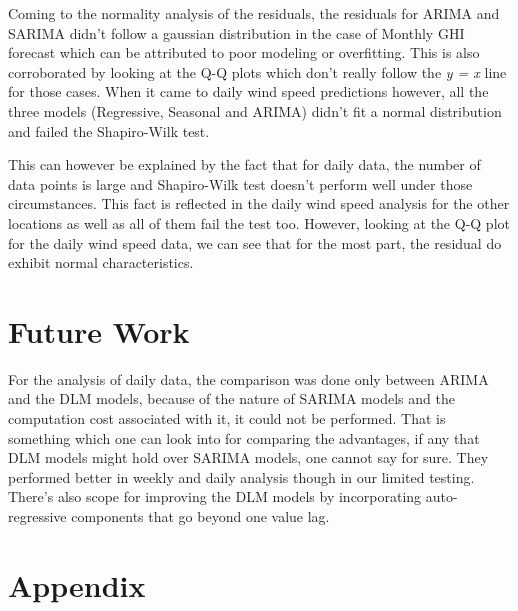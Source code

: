 \documentclass[a4paper,12pt]{article}
\begin{document}
Coming to the normality analysis of the residuals, the residuals for ARIMA and SARIMA didn't follow a gaussian distribution in the case of Monthly GHI forecast which can be attributed to poor modeling or overfitting. This is also corroborated by looking at the Q-Q plots which don't really follow the \emph{y = x} line for those cases. When it came to daily wind speed predictions however, all the three models (Regressive, Seasonal and ARIMA) didn't fit a normal distribution and failed the Shapiro-Wilk test.

This can however be explained by the fact that for daily data, the number of data points is large and Shapiro-Wilk test doesn't perform well under those circumstances. This fact is reflected in the daily wind speed analysis for the other locations as well as all of them fail the test too. However, looking at the Q-Q plot for the daily wind speed data, we can see that for the most part, the residual do exhibit normal characteristics.
\section{Future Work}
\label{sec:orgacdd32e}
For the analysis of daily data, the comparison was done only between ARIMA and the DLM models, because of the nature of SARIMA models and the computation cost associated with it, it could not be performed. That is something which one can look into for comparing the advantages, if any that DLM models might hold over SARIMA models, one cannot say for sure. They performed better in weekly and daily analysis though in our limited testing. There's also scope for improving the DLM models by incorporating auto-regressive components that go beyond one value lag.
\pagebreak
\section{Appendix}
\label{sec:org660708f}
\end{document}
